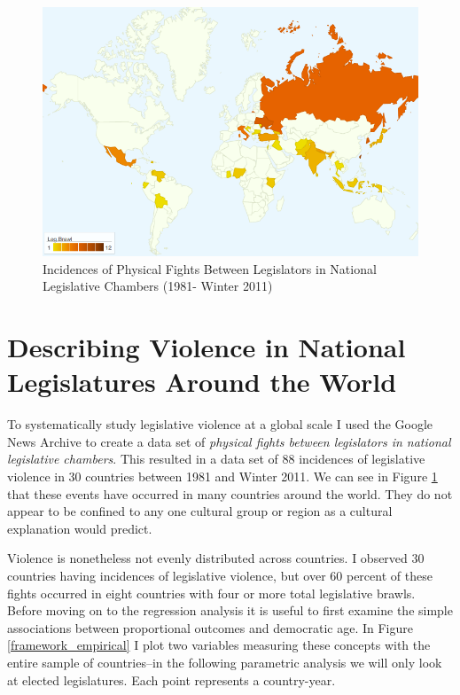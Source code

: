 \documentclass[a4paper]{article}\usepackage{graphicx, color}
\begin{document}
\begin{figure}[h!]
    \centering
    \caption{Incidences of Physical Fights Between Legislators in National Legislative Chambers (1981- Winter 2011)}
    \label{leg_map}
        \includegraphics[width = 13cm]{incidence_map.png}
\end{figure}

\section{Describing Violence in National Legislatures Around the World}

To systematically study legislative violence at a global scale I used the Google News Archive to create a data set of {\emph{physical fights between legislators in national legislative chambers}}. This resulted in a data set of 88 incidences of legislative violence in 30 countries between 1981 and Winter 2011. We can see in Figure \ref{leg_map} that these events have occurred in many countries around the world. They do not appear to be confined to any one cultural group or region as a cultural explanation would predict. 

Violence is nonetheless not evenly distributed across countries. I observed 30 countries having incidences of legislative violence, but over 60 percent of these fights occurred in eight countries with four or more total legislative brawls. Before moving on to the regression analysis it is useful to first examine the simple associations between proportional outcomes and democratic age. In Figure \ref{framework_empirical} I plot two variables measuring these concepts with the entire sample of countries--in the following parametric analysis we will only look at elected legislatures. Each point represents a country-year. 
\end{document}
